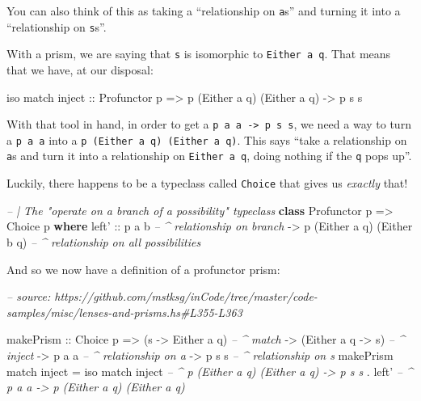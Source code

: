 \documentclass[]{article}
\newenvironment{Shaded}{}{}
\newcommand{\CommentTok}[1]{\textcolor[rgb]{0.38,0.63,0.69}{\textit{#1}}}
\newcommand{\DataTypeTok}[1]{\textcolor[rgb]{0.56,0.13,0.00}{#1}}
\newcommand{\FunctionTok}[1]{\textcolor[rgb]{0.02,0.16,0.49}{#1}}
\newcommand{\KeywordTok}[1]{\textcolor[rgb]{0.00,0.44,0.13}{\textbf{#1}}}
\newcommand{\NormalTok}[1]{#1}
\newcommand{\OtherTok}[1]{\textcolor[rgb]{0.00,0.44,0.13}{#1}}
\begin{document}
You can also think of this as taking a ``relationship on \texttt{a}s'' and
turning it into a ``relationship on \texttt{s}s''.

With a prism, we are saying that \texttt{s} is isomorphic to
\texttt{Either\ a\ q}. That means that we have, at our disposal:

\begin{Shaded}
\begin{Highlighting}[]
\NormalTok{iso match inject}
\OtherTok{    ::} \DataTypeTok{Profunctor}\NormalTok{ p}
    \OtherTok{=>}\NormalTok{ p (}\DataTypeTok{Either}\NormalTok{ a q) (}\DataTypeTok{Either}\NormalTok{ a q)}
    \OtherTok{->}\NormalTok{ p s s}
\end{Highlighting}
\end{Shaded}

With that tool in hand, in order to get a
\texttt{p\ a\ a\ -\textgreater{}\ p\ s\ s}, we need a way to turn a
\texttt{p\ a\ a} into a \texttt{p\ (Either\ a\ q)\ (Either\ a\ q)}. This says
``take a relationship on \texttt{a}s and turn it into a relationship on
\texttt{Either\ a\ q}, doing nothing if the \texttt{q} pops up''.

Luckily, there happens to be a typeclass called \texttt{Choice} that gives us
\emph{exactly} that!

\begin{Shaded}
\begin{Highlighting}[]
\CommentTok{-- | The "operate on a branch of a possibility" typeclass}
\KeywordTok{class} \DataTypeTok{Profunctor}\NormalTok{ p }\OtherTok{=>} \DataTypeTok{Choice}\NormalTok{ p }\KeywordTok{where}
\NormalTok{    left'}
\OtherTok{        ::}\NormalTok{ p a b                        }\CommentTok{-- ^ relationship on branch}
        \OtherTok{->}\NormalTok{ p (}\DataTypeTok{Either}\NormalTok{ a q) (}\DataTypeTok{Either}\NormalTok{ b q)  }\CommentTok{-- ^ relationship on all possibilities}
\end{Highlighting}
\end{Shaded}

And so we now have a definition of a profunctor prism:

\begin{Shaded}
\begin{Highlighting}[]
\CommentTok{-- source: https://github.com/mstksg/inCode/tree/master/code-samples/misc/lenses-and-prisms.hs#L355-L363}

\NormalTok{makePrism}
\OtherTok{    ::} \DataTypeTok{Choice}\NormalTok{ p}
    \OtherTok{=>}\NormalTok{ (s }\OtherTok{->} \DataTypeTok{Either}\NormalTok{ a q)    }\CommentTok{-- ^ match}
    \OtherTok{->}\NormalTok{ (}\DataTypeTok{Either}\NormalTok{ a q }\OtherTok{->}\NormalTok{ s)    }\CommentTok{-- ^ inject}
    \OtherTok{->}\NormalTok{ p a a                }\CommentTok{-- ^ relationship on a}
    \OtherTok{->}\NormalTok{ p s s                }\CommentTok{-- ^ relationship on s}
\NormalTok{makePrism match inject }\FunctionTok{=}
\NormalTok{    iso match inject   }\CommentTok{-- ^ p (Either a q) (Either a q) -> p s s}
  \FunctionTok{.}\NormalTok{ left'              }\CommentTok{-- ^ p a a -> p (Either a q) (Either a q)}
\end{Highlighting}
\end{Shaded}
\end{document}
